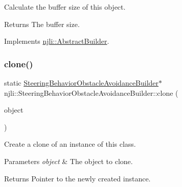 Calculate the buffer size of this object.

\begin{DoxyReturn}{Returns}
The buffer size. 
\end{DoxyReturn}


Implements \mbox{\hyperlink{classnjli_1_1_abstract_builder_aa1d220053e182c37b31b427499c6eacf}{njli\+::\+Abstract\+Builder}}.

\mbox{\label{classnjli_1_1_steering_behavior_obstacle_avoidance_builder_aaf913b46a7f73b5b7979b574f9da2d73}} 
\subsubsection{\texorpdfstring{clone()}{clone()}}
{\footnotesize\ttfamily static \mbox{\hyperlink{classnjli_1_1_steering_behavior_obstacle_avoidance_builder}{Steering\+Behavior\+Obstacle\+Avoidance\+Builder}}$\ast$ njli\+::\+Steering\+Behavior\+Obstacle\+Avoidance\+Builder\+::clone (\begin{DoxyParamCaption}\item[{const \mbox{\hyperlink{classnjli_1_1_steering_behavior_obstacle_avoidance_builder}{Steering\+Behavior\+Obstacle\+Avoidance\+Builder}} \&}]{object }\end{DoxyParamCaption})\hspace{0.3cm}{\ttfamily [static]}}

Create a clone of an instance of this class.


\begin{DoxyParams}{Parameters}
{\em object} & The object to clone.\\
\hline
\end{DoxyParams}
\begin{DoxyReturn}{Returns}
Pointer to the newly created instance. 
\end{DoxyReturn}
\mbox{\label{classnjli_1_1_steering_behavior_obstacle_avoidance_builder_ad122d39203a8b5e26325b35f7d7b839b}} 
